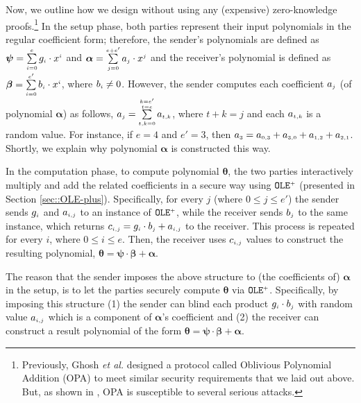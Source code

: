 Now, we outline how we design \vopr without using any (expensive) zero-knowledge proofs.\footnote{Previously, Ghosh \textit{et al.}  \cite{GhoshN19} designed a protocol called Oblivious Polynomial Addition (OPA) to meet similar security requirements that we laid out above. But, as shown in \cite{AbadiMZ21}, OPA  is susceptible to several serious attacks. } In the setup phase, both parties represent their input polynomials in the regular coefficient form; therefore, the sender's polynomials are defined as $\bm\psi=\sum\limits^{\scriptscriptstyle e}_{\scriptscriptstyle i=0}g_{\scriptscriptstyle i}\cdot x^{\scriptscriptstyle i}$ and  $\bm\alpha=\sum\limits^{\scriptscriptstyle e+e'}_{\scriptscriptstyle j=0}a_{\scriptscriptstyle j}\cdot x^{\scriptscriptstyle j}$ and the receiver's polynomial is defined as $\bm\beta=\sum\limits^{\scriptscriptstyle e'}_{\scriptscriptstyle i=0}b_{\scriptscriptstyle i}\cdot x^{\scriptscriptstyle i}$, where $b_{\scriptscriptstyle i}\neq 0$. However, the sender computes each coefficient $a_{\scriptscriptstyle j}$ (of polynomial $\bm \alpha$) as follows,  $a_{\scriptscriptstyle j}=\sum\limits^{\substack{\scriptscriptstyle k=e'\\ \scriptscriptstyle t=e}}_{\scriptscriptstyle t,k=0} a_{\scriptscriptstyle t,k}$,  where  $t+k=j$ and each $a_{\scriptscriptstyle t,k}$ is a random value. For instance, if $e=4$ and $e'=3$, then $a_{\scriptscriptstyle 3}=a_{\scriptscriptstyle \scriptscriptstyle 0,3}+a_{\scriptscriptstyle 3,0}+a_{\scriptscriptstyle 1,2}+a_{\scriptscriptstyle 2,1}$. Shortly, we explain why polynomial $\bm\alpha$ is constructed this way. 



In the computation phase,  to compute polynomial $\bm\theta$, the two parties interactively multiply and add the related coefficients in a secure way using $\mathtt{OLE}^{\scriptscriptstyle +}$ (presented in Section \ref{sec::OLE-plus}). Specifically,
%
%
for every $j$  (where $0\leq j\leq e'$) the sender sends $g_{\scriptscriptstyle i}$ and $a_{\scriptscriptstyle i,j}$ to an instance of  $\mathtt{OLE}^{\scriptscriptstyle +}$, while the receiver sends $b_{\scriptscriptstyle j}$ to the same instance,  which returns $c_{\scriptscriptstyle i,j}=g_{\scriptscriptstyle i}\cdot b_{\scriptscriptstyle j}+ a_{\scriptscriptstyle i,j}$ to the receiver. This process is repeated for every $i$, where $0 \leq i \leq e$. Then, the receiver uses $c_{\scriptscriptstyle i,j}$ values to construct the resulting polynomial, $\bm\theta=\bm\psi\cdot \bm\beta+\bm\alpha$.  


The reason that the sender imposes the above structure to (the coefficients of)  $\bm\alpha$ in the setup, is to let the parties securely compute $\bm\theta$ via  $\mathtt{OLE}^{\scriptscriptstyle +}$. Specifically, by imposing this structure (1) the sender  can blind each product $g_{\scriptscriptstyle i}\cdot b_{\scriptscriptstyle j}$  with  random value $a_{\scriptscriptstyle i,j}$ which is a component of $\bm\alpha$'s coefficient and (2) the receiver can construct a result polynomial of the form $\bm\theta=\bm\psi\cdot \bm\beta+\bm\alpha$. 


